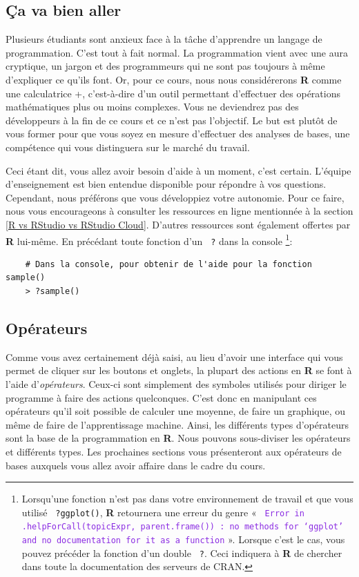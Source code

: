 \documentclass[10.5pt,a4paper]{article}
\newcommand{\rcode}[1]{\texttt{\color{rstudio} #1}}
\begin{document}
  \subsection{Ça va bien aller}
  Plusieurs étudiants sont anxieux face à la tâche d'apprendre un langage de programmation. C'est tout à fait normal. La programmation vient avec une aura cryptique, un jargon et des programmeurs qui ne sont pas toujours à même d'expliquer ce qu'ils font. Or, pour ce cours, nous nous considérerons \textbf{R} comme une calculatrice +, c'est-à-dire d'un outil permettant d'effectuer des opérations mathématiques plus ou moins complexes. Vous ne deviendrez pas des développeurs à la fin de ce cours et ce n'est pas l'objectif. Le but est plutôt de vous former pour que vous soyez en mesure d'effectuer des analyses de bases, une compétence qui vous distinguera sur le marché du travail.

Ceci étant dit, vous allez avoir besoin d'aide à un moment, c'est certain. L'équipe d'enseignement est bien entendue disponible pour répondre à vos questions. Cependant, nous préférons que vous développiez votre autonomie. Pour ce faire, nous vous encourageons à consulter les ressources en ligne mentionnée à la section \ref{R vs RStudio vs RStudio Cloud}. D'autres ressources sont également offertes par \textbf{R} lui-même. En précédant toute fonction d'un \rcode{?} dans la console \footnote{Lorsqu'une fonction n'est pas dans votre environnement de travail et que vous utilisé \rcode{?ggplot()}, \textbf{R} retournera une erreur du genre « \textcolor{BlueViolet}{\rcode{Error in .helpForCall(topicExpr, parent.frame()) : no methods for ‘ggplot’ and no documentation for it as a function}} ». Lorsque c'est le cas, vous pouvez précéder la fonction d'un double \rcode{?}. Ceci indiquera à \textbf{R} de chercher dans toute la documentation des serveurs de CRAN.}:

  \begin{lstlisting}
    # Dans la console, pour obtenir de l'aide pour la fonction sample()
    > ?sample()
  \end{lstlisting}
  
  \subsection{Opérateurs}
 Comme vous avez certainement déjà saisi, au lieu d'avoir une interface qui vous permet de cliquer sur les boutons et onglets, la plupart des actions en \textbf{R} se font à l'aide d'\emph{opérateurs}. Ceux-ci sont simplement des symboles utilisés pour diriger le programme à faire des actions quelconques. C'est donc en manipulant ces opérateurs qu'il soit possible de calculer une moyenne, de faire un graphique, ou même de faire de l'apprentissage machine. Ainsi, les différents types d'opérateurs sont la base de la programmation en \textbf{R}. Nous pouvons sous-diviser les opérateurs et différents types. Les prochaines sections vous présenteront aux opérateurs de bases auxquels vous allez avoir affaire dans le cadre du cours. 
 
\end{document}
